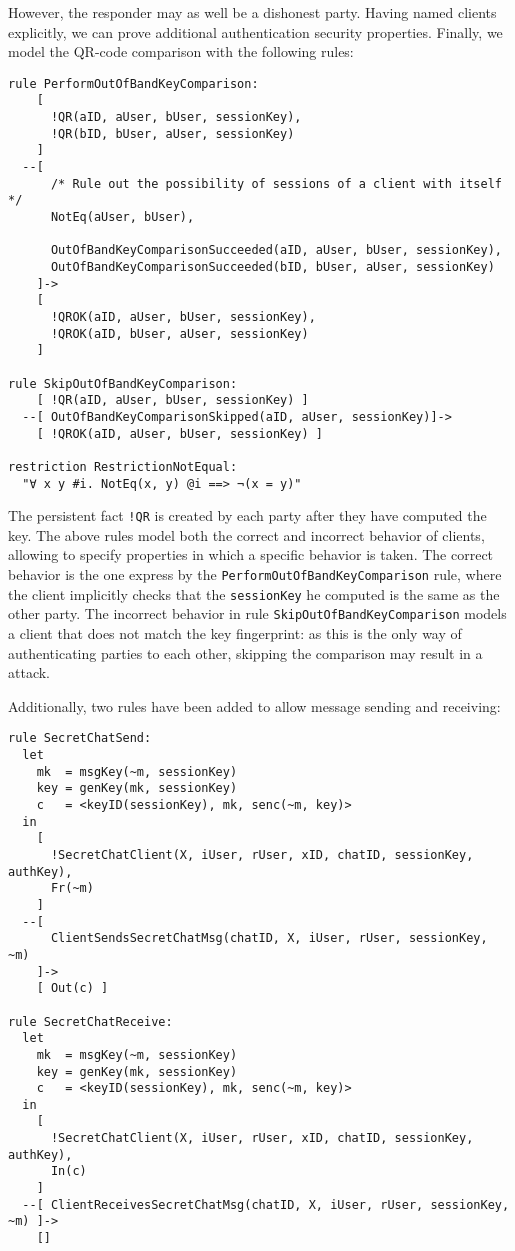 However, the responder may as well be a dishonest party. Having named clients explicitly, we can prove additional authentication security properties.
Finally, we model the QR-code comparison with the following rules:

\begin{lstlisting}
rule PerformOutOfBandKeyComparison:
    [ 
      !QR(aID, aUser, bUser, sessionKey),
      !QR(bID, bUser, aUser, sessionKey)
    ]
  --[ 
      /* Rule out the possibility of sessions of a client with itself */
      NotEq(aUser, bUser),

      OutOfBandKeyComparisonSucceeded(aID, aUser, bUser, sessionKey),
      OutOfBandKeyComparisonSucceeded(bID, bUser, aUser, sessionKey)
    ]->
    [
      !QROK(aID, aUser, bUser, sessionKey),
      !QROK(aID, bUser, aUser, sessionKey)
    ]

rule SkipOutOfBandKeyComparison:
    [ !QR(aID, aUser, bUser, sessionKey) ]
  --[ OutOfBandKeyComparisonSkipped(aID, aUser, sessionKey)]->
    [ !QROK(aID, aUser, bUser, sessionKey) ]

restriction RestrictionNotEqual:
  "∀ x y #i. NotEq(x, y) @i ==> ¬(x = y)"
\end{lstlisting}

The persistent fact \lstinline{!QR} is created by each party after they have computed the \schat{} key. The above rules model both the correct and incorrect behavior of clients, allowing to specify properties in which a specific behavior is taken. The correct behavior is the one express by the \lstinline{PerformOutOfBandKeyComparison} rule, where the client implicitly checks that the \lstinline{sessionKey} he computed is the same as the other party. The incorrect behavior in rule \lstinline{SkipOutOfBandKeyComparison} models a client that does not match the key fingerprint: as this is the only way of authenticating parties to each other, skipping the comparison may result in a \DiHe{} \mitm{} attack.

Additionally, two rules have been added to allow message sending and receiving:

\begin{lstlisting}
rule SecretChatSend:
  let
    mk  = msgKey(~m, sessionKey)
    key = genKey(mk, sessionKey)
    c   = <keyID(sessionKey), mk, senc(~m, key)>
  in
    [ 
      !SecretChatClient(X, iUser, rUser, xID, chatID, sessionKey, authKey),
      Fr(~m)
    ]
  --[
      ClientSendsSecretChatMsg(chatID, X, iUser, rUser, sessionKey, ~m)
    ]->
    [ Out(c) ]

rule SecretChatReceive:
  let
    mk  = msgKey(~m, sessionKey)
    key = genKey(mk, sessionKey)
    c   = <keyID(sessionKey), mk, senc(~m, key)>
  in
    [
      !SecretChatClient(X, iUser, rUser, xID, chatID, sessionKey, authKey),
      In(c)
    ]
  --[ ClientReceivesSecretChatMsg(chatID, X, iUser, rUser, sessionKey, ~m) ]->
    []
\end{lstlisting}

